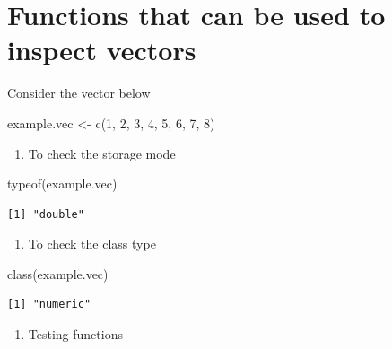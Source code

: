 \documentclass[
  letterpaper,
  DIV=11,
  numbers=noendperiod]{scrreprt}
\newenvironment{Shaded}{\begin{snugshade}}{\end{snugshade}}
\newcommand{\DecValTok}[1]{\textcolor[rgb]{0.68,0.00,0.00}{#1}}
\newcommand{\FunctionTok}[1]{\textcolor[rgb]{0.28,0.35,0.67}{#1}}
\newcommand{\NormalTok}[1]{\textcolor[rgb]{0.00,0.23,0.31}{#1}}
\newcommand{\OtherTok}[1]{\textcolor[rgb]{0.00,0.23,0.31}{#1}}
\providecommand{\tightlist}{%
  \setlength{\itemsep}{0pt}\setlength{\parskip}{0pt}}\usepackage{longtable,booktabs,array}
\begin{document}
\hypertarget{functions-that-can-be-used-to-inspect-vectors}{%
\section{Functions that can be used to inspect
vectors}\label{functions-that-can-be-used-to-inspect-vectors}}

Consider the vector below

\begin{Shaded}
\begin{Highlighting}[]
\NormalTok{example.vec }\OtherTok{\textless{}{-}} \FunctionTok{c}\NormalTok{(}\DecValTok{1}\NormalTok{,  }\DecValTok{2}\NormalTok{,  }\DecValTok{3}\NormalTok{, }\DecValTok{4}\NormalTok{, }\DecValTok{5}\NormalTok{, }\DecValTok{6}\NormalTok{, }\DecValTok{7}\NormalTok{, }\DecValTok{8}\NormalTok{)}
\end{Highlighting}
\end{Shaded}

\begin{enumerate}
\def\labelenumi{\arabic{enumi}.}
\tightlist
\item
  To check the storage mode
\end{enumerate}

\begin{Shaded}
\begin{Highlighting}[]
\FunctionTok{typeof}\NormalTok{(example.vec)}
\end{Highlighting}
\end{Shaded}

\begin{verbatim}
[1] "double"
\end{verbatim}

\begin{enumerate}
\def\labelenumi{\arabic{enumi}.}
\setcounter{enumi}{1}
\tightlist
\item
  To check the class type
\end{enumerate}

\begin{Shaded}
\begin{Highlighting}[]
\FunctionTok{class}\NormalTok{(example.vec)}
\end{Highlighting}
\end{Shaded}

\begin{verbatim}
[1] "numeric"
\end{verbatim}

\begin{enumerate}
\def\labelenumi{\arabic{enumi}.}
\setcounter{enumi}{2}
\tightlist
\item
  Testing functions
\end{enumerate}
\end{document}
